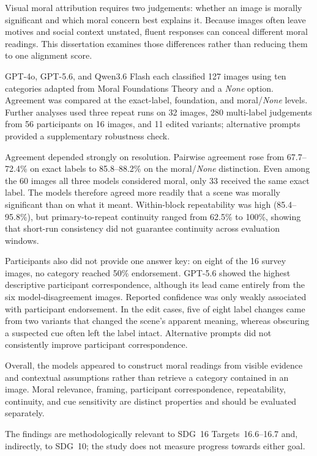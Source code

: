 Visual moral attribution requires two judgements: whether an image is morally
significant and which moral concern best explains it. Because images often
leave motives and social context unstated, fluent responses can conceal
different moral readings. This dissertation examines those differences rather
than reducing them to one alignment score.

GPT-4o, GPT-5.6, and Qwen3.6 Flash each classified 127 images using ten
categories adapted from Moral Foundations Theory and a \textit{None} option.
Agreement was compared at the exact-label, foundation, and
moral/\textit{None} levels. Further analyses used three repeat runs on 32
images, 280 multi-label judgements from 56 participants on 16 images, and 11
edited variants; alternative prompts provided a supplementary robustness
check.

Agreement depended strongly on resolution. Pairwise agreement rose from
67.7--72.4\% on exact labels to 85.8--88.2\% on the
moral/\textit{None} distinction. Even among the 60 images all three models
considered moral, only 33 received the same exact label. The models therefore
agreed more readily that a scene was morally significant than on what it meant.
Within-block repeatability was high (85.4--95.8\%), but primary-to-repeat
continuity ranged from 62.5\% to 100\%, showing that short-run consistency did
not guarantee continuity across evaluation windows.

Participants also did not provide one answer key: on eight of the 16 survey
images, no category reached 50\% endorsement. GPT-5.6 showed the highest
descriptive participant correspondence, although its lead came entirely from
the six model-disagreement images. Reported confidence was only weakly
associated with participant endorsement. In the edit cases, five of eight label
changes came from two variants that changed the scene's apparent meaning,
whereas obscuring a suspected cue often left the label intact. Alternative
prompts did not consistently improve participant correspondence.

Overall, the models appeared to construct moral readings from visible evidence
and contextual assumptions rather than retrieve a category contained in an
image. Moral relevance, framing, participant correspondence, repeatability,
continuity, and cue sensitivity are distinct properties and should be evaluated
separately.

The findings are methodologically relevant to SDG~16 Targets~16.6--16.7 and,
indirectly, to SDG~10; the study does not measure progress towards either goal.

